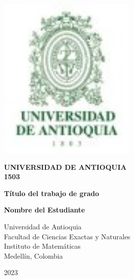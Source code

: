 \documentclass[12pt]{article}
\begin{document}
\begin{titlepage}
    \centering
    \includegraphics[width=0.5\textwidth]{logoudea.jpg}\\
    \vspace*{1cm}
    
    {\Large\textbf{UNIVERSIDAD DE ANTIOQUIA}\\}
    \vspace*{0.5cm}
    {\large\textbf{1503}}\\
    \vspace{3cm}
    
    {\Large\textbf{Título del trabajo de grado}\\}
    \vspace{2cm}
    
    {\Large\textbf{Nombre del Estudiante}\\}
    \vfill
    
    {\large Universidad de Antioquia\\
    Facultad de Ciencias Exactas y Naturales\\
    Instituto de Matemáticas\\
    Medellín, Colombia\\}
    
    {\large 2023\\}
\end{titlepage}

    \begin{center}
    \end{center}
\end{document}
